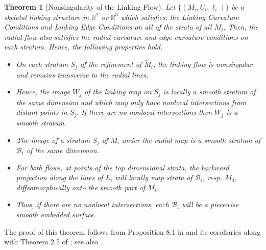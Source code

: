 \documentclass[10pt]{amsart}
\newtheorem{Thm}{Theorem}[section] \newtheorem{TitleThm}[Thm]{}
\theoremstyle{definition}
\theoremstyle{definition}
\numberwithin{equation}{section}
\newcommand{\R}{{\mathbb R}}
\newcommand{\flushpar}{\par \noindent}
\def \cB {\mathcal{B}}
\begin{document}
\begin{Thm}[Nonsingularity of the Linking Flow]
\label{Thm1} 
Let $\{(M_i, U_i, \ell_i)\}$ be a skeletal linking structure in $\R^2$ or 
$\R^3$ which satisfies: the Linking Curvature Conditions and Linking Edge 
Conditions on all of the strata of all $M_i$.  Then, the radial flow also 
satisfies the radial curvature and edge curvature conditions on each 
stratum.  Hence, the following properties hold. \flushpar
\begin{itemize}
\item[i)]  On each stratum $S_j$ of the refinement of $\tilde M_i$, the 
linking flow is nonsingular and remains transverse to the radial lines.  
\item[ii)]  Hence, the image $W_j$ of the linking map on $S_j$ is locally a 
smooth stratum of the same dimension and which may only have nonlocal 
intersections from distant points in $S_j$.  If there are no nonlocal 
intersections then $W_j$ is a smooth stratum.  
\item[iii)]  The image of a stratum $S_j$ of $\tilde M_i$ under the radial 
map is a smooth stratum of $\cB_i$ of the same dimension. 
\item[iv)]  For both flows, at points of the top dimensional strata, the 
backward projection along the lines of $L_i$ will locally map strata of 
$\cB_i$, resp. $M_0$, diffeomorphically onto the smooth part of $M_i$.  
\item[v)]  Thus, if there are no nonlocal intersections, each $\cB_i$ will 
be a piecewise smooth embedded surface.  
\end{itemize}
\end{Thm}
\par 
The proof of this theorem follows from Proposition 8.1 in \cite{DG} and 
its corollaries along with Theorem 2.5 of \cite{D3}; see also 
\cite[Chap. 6]{Ga}.  
\par
\end{document}
